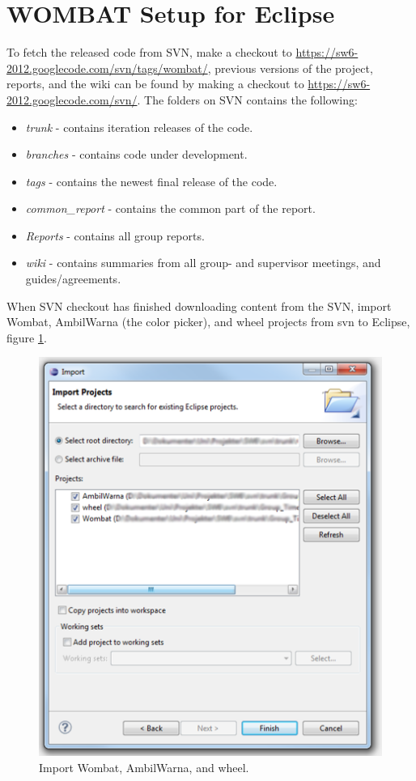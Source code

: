 \section{WOMBAT Setup for Eclipse}
To fetch the released code from SVN, make a checkout to \url{https://sw6-2012.googlecode.com/svn/tags/wombat/}, previous versions of the project, reports, and the wiki can be found by making a checkout to \url{https://sw6-2012.googlecode.com/svn/}.
The folders on SVN contains the following:

	\begin{itemize}
		\item \textit{trunk} - contains iteration releases of the code.
		\item \textit{branches} - contains code under development.
		\item \textit{tags} - contains the newest final release of the code.
		\item \textit{common\_report} - contains the common part of the report.
		\item \textit{Reports} - contains all group reports.
		\item \textit{wiki} - contains summaries from all group- and supervisor meetings, and guides/agreements.
	\end{itemize}
	
When SVN checkout has finished downloading content from the SVN, import Wombat, AmbilWarna (the color picker), and wheel projects from svn to Eclipse, figure \ref{fig:import1}.

\begin{figure}[H]
	\centering
		\includegraphics[scale=0.2]{Images/how_to_wombat/import1.png}
	\caption{Import Wombat, AmbilWarna, and wheel.}
	\label{fig:import1}
\end{figure}

